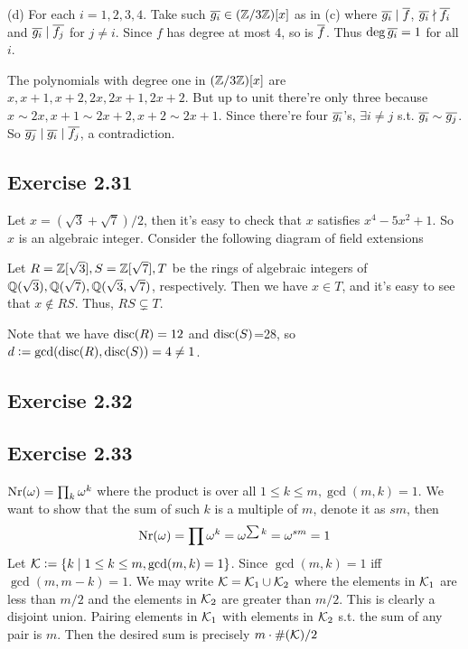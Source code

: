 \documentclass[../Marcus.tex]{subfiles}
\begin{document}
(d) For each $i=1,2,3,4$. Take such $\overline{g_i}\in(\mathbb{Z}/3\mathbb{Z})[x]$ as in (c) where $\overline{g_i}\mid\overline{f}$, $\overline{g_i}\nmid\overline{f_i}$ and $\overline{g_i}\mid\overline{f_j}$ for $j\neq i$. Since $f$ has degree at most 4, so is $\overline{f}$. Thus $\deg\overline{g_i}=1$ for all $i$.

The polynomials with degree one in $(\mathbb{Z}/3\mathbb{Z})[x]$ are $x,x+1,x+2,2x,2x+1,2x+2$. But up to unit there're only three because $x\sim2x,x+1\sim2x+2,x+2\sim2x+1$. Since there're four $\overline{g_i}$'s, $\exists i\neq j$ s.t. $\overline{g_i}\sim \overline{g_j}$. So $\overline{g_j}\mid\overline{g_i}\mid\overline{f_j}$, a contradiction. 

\subsection*{Exercise 2.31}

Let $x=(\sqrt{3}+\sqrt{7})/2$, then it's easy to check that $x$ satisfies $x^4-5x^2+1$. So $x$ is an algebraic integer. Consider the following diagram of field extensions
\begin{center}
\end{center}
Let $R=\mathbb{Z}[\sqrt{3}],S=\mathbb{Z}[\sqrt{7}],T$ be the rings of algebraic integers of $\mathbb{Q}(\sqrt{3}),\mathbb{Q}(\sqrt{7}),\mathbb{Q}(\sqrt{3},\sqrt{7})$, respectively. Then we have $x\in T$, and it's easy to see that $x\notin RS$. Thus, $RS\varsubsetneq T$. 

Note that we have $\operatorname{disc}(R)=12$ and $\operatorname{disc}(S)$=28, so $d:=\gcd(\operatorname{disc}(R),\operatorname{disc}(S))=4\neq1$.

\subsection*{Exercise 2.32}

\subsection*{Exercise 2.33}

$\operatorname{Nr}(\omega)=\prod_{k} \omega^k$ where the product is over all $1\leq k\leq m,\gcd(m,k)=1$. We want to show that the sum of such $k$ is a multiple of $m$, denote it as $sm$, then $$\operatorname{Nr}(\omega)=\prod \omega^k=\omega^{\sum k}=\omega^{sm}=1$$ Let $\mathcal{K}:=\{k\mid 1\leq k\leq m,\gcd(m,k)=1\}$. Since $\gcd(m,k)=1$ iff $\gcd(m,m-k)=1$. We may write $\mathcal{K}=\mathcal{K}_1\cup\mathcal{K}_2$ where the elements in $\mathcal{K}_1$ are less than $m/2$ and the elements in $\mathcal{K}_2$ are greater than $m/2$. This is clearly a disjoint union. Pairing elements in $\mathcal{K}_1$ with elements in $\mathcal{K}_2$ s.t. the sum of any pair is $m$. Then the desired sum is precisely $m\cdot\#(\mathcal{K})/2$
\end{document}
